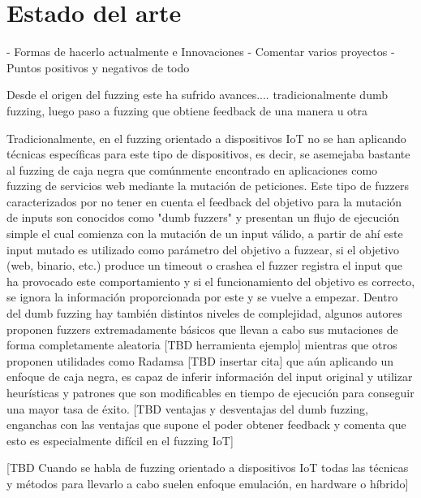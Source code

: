 \chapter{Estado del arte}
\label{estado_del_arte}

- Formas de hacerlo actualmente e Innovaciones
- Comentar varios proyectos
- Puntos positivos y negativos de todo

Desde el origen del fuzzing este ha sufrido avances.... tradicionalmente dumb fuzzing, luego 
paso a fuzzing que obtiene feedback de una manera u otra

Tradicionalmente, en el fuzzing orientado a dispositivos IoT no se han aplicando técnicas
específicas para este tipo de dispositivos, es decir, se asemejaba bastante al fuzzing de caja negra que 
comúnmente encontrado en aplicaciones como fuzzing de servicios web mediante la mutación de peticiones.
Este tipo de fuzzers caracterizados por no tener en cuenta el feedback del objetivo para la mutación de
inputs son conocidos como "dumb fuzzers" y presentan un flujo de ejecución simple el cual comienza 
con la mutación de un input válido,
a partir de ahí este input mutado es utilizado como parámetro del objetivo a fuzzear, si el 
objetivo (web, binario, etc.) produce un timeout o crashea el fuzzer registra el input que 
ha provocado este comportamiento y si el funcionamiento del objetivo es correcto, se ignora 
la información proporcionada por este y se vuelve a empezar. Dentro del dumb fuzzing hay también
distintos niveles de complejidad, algunos autores proponen fuzzers extremadamente básicos que 
llevan a cabo sus mutaciones de forma completamente aleatoria [TBD herramienta ejemplo] mientras 
que otros proponen utilidades como Radamsa [TBD insertar cita] que aún aplicando un enfoque de caja negra,
es capaz de inferir información del input original y utilizar heurísticas y patrones que son
modificables en tiempo de ejecución para conseguir una mayor tasa de éxito. [TBD ventajas y 
desventajas del dumb fuzzing, enganchas con las ventajas que supone el poder obtener feedback 
y comenta que esto es especialmente difícil en el fuzzing IoT]


[TBD Cuando se habla de fuzzing orientado a dispositivos IoT todas las técnicas y métodos para llevarlo 
a cabo suelen enfoque emulación, en hardware o híbrido]